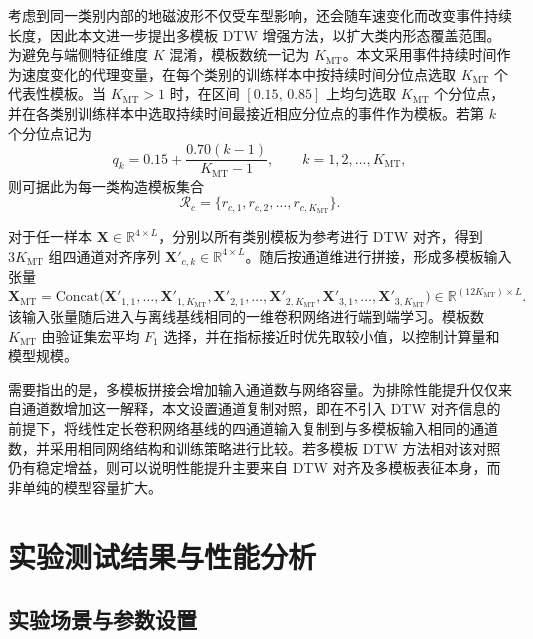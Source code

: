 \documentclass{xdupgthesis}
\begin{document}
考虑到同一类别内部的地磁波形不仅受车型影响，还会随车速变化而改变事件持续长度，因此本文进一步提出多模板 DTW 增强方法，以扩大类内形态覆盖范围。为避免与端侧特征维度 $K$ 混淆，模板数统一记为 $K_{\mathrm{MT}}$。本文采用事件持续时间作为速度变化的代理变量，在每个类别的训练样本中按持续时间分位点选取 $K_{\mathrm{MT}}$ 个代表性模板。当 $K_{\mathrm{MT}}>1$ 时，在区间 $[0.15,\,0.85]$ 上均匀选取 $K_{\mathrm{MT}}$ 个分位点，并在各类别训练样本中选取持续时间最接近相应分位点的事件作为模板。若第 $k$ 个分位点记为
\begin{equation}
    q_k=0.15+\frac{0.70(k-1)}{K_{\mathrm{MT}}-1},\qquad k=1,2,\ldots,K_{\mathrm{MT}},
\end{equation}
则可据此为每一类构造模板集合
\begin{equation}
    \mathcal{R}_c=\{r_{c,1},r_{c,2},\ldots,r_{c,K_{\mathrm{MT}}}\}.
\end{equation}

对于任一样本 $\mathbf{X}\in\mathbb{R}^{4\times L}$，分别以所有类别模板为参考进行 DTW 对齐，得到 $3K_{\mathrm{MT}}$ 组四通道对齐序列 $\mathbf{X}'_{c,k}\in\mathbb{R}^{4\times L}$。随后按通道维进行拼接，形成多模板输入张量
\begin{equation}
    \mathbf{X}_{\mathrm{MT}}=
    \mathrm{Concat}\Big(
    \mathbf{X}'_{1,1},\ldots,\mathbf{X}'_{1,K_{\mathrm{MT}}},
    \mathbf{X}'_{2,1},\ldots,\mathbf{X}'_{2,K_{\mathrm{MT}}},
    \mathbf{X}'_{3,1},\ldots,\mathbf{X}'_{3,K_{\mathrm{MT}}}
    \Big)\in\mathbb{R}^{(12K_{\mathrm{MT}})\times L}.
\end{equation}
该输入张量随后进入与离线基线相同的一维卷积网络进行端到端学习。模板数 $K_{\mathrm{MT}}$ 由验证集宏平均 $F_1$ 选择，并在指标接近时优先取较小值，以控制计算量和模型规模。

需要指出的是，多模板拼接会增加输入通道数与网络容量。为排除性能提升仅仅来自通道数增加这一解释，本文设置通道复制对照，即在不引入 DTW 对齐信息的前提下，将线性定长卷积网络基线的四通道输入复制到与多模板输入相同的通道数，并采用相同网络结构和训练策略进行比较。若多模板 DTW 方法相对该对照仍有稳定增益，则可以说明性能提升主要来自 DTW 对齐及多模板表征本身，而非单纯的模型容量扩大。


\section{实验测试结果与性能分析}
\label{sec:ch3_exp}

\subsection{实验场景与参数设置}
\label{subsec:ch3_exp_setup}
\end{document}
